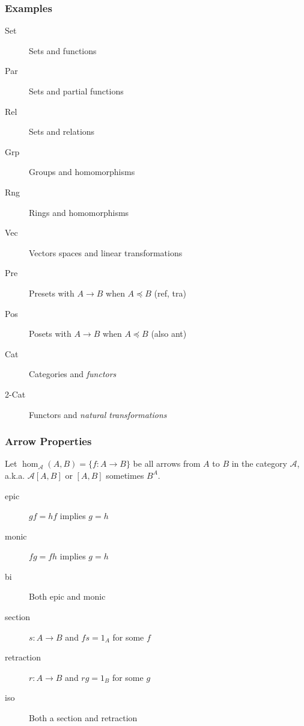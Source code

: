 \documentclass[12pt,fleqn]{beamer}
\begin{document}
\begin{frame}
\frametitle{Examples}
\begin{description}
\item[Set] Sets and functions
\item[Par] Sets and partial functions
\item[Rel] Sets and relations
\item[Grp] Groups and homomorphisms
\item[Rng] Rings and homomorphisms
\item[Vec] Vectors spaces and linear transformations
\item[Pre] Presets with \(A\to B\) when \(A\preceq B\) (ref, tra)
\item[Pos] Posets with \(A\to B\) when \(A\preceq B\) (also ant)
\item[Cat] Categories and {\em functors}
\item[2-Cat] Functors and {\em natural transformations}
\end{description}
\end{frame}

\begin{frame}
\frametitle{Arrow Properties}
Let \(\hom_\mathcal{A}(A,B) = \{f\colon A\to B\}\) be all arrows from \(A\) to \(B\)
in the category \(\mathcal{A}\),
a.k.a. \(\mathcal{A}[A,B]\) or \([A,B]\) sometimes \(B^A\).
\begin{description}
\item[epic] \(gf = hf\) implies \(g = h\)
\item[monic] \(fg = fh\) implies \(g = h\)
\item[bi] Both epic and monic
\item[section] \(s\colon A\to B\) and \(fs = 1_A\) for some \(f\)
\item[retraction] \(r\colon A\to B\) and \(rg = 1_B\) for some \(g\)
\item[iso] Both a section and retraction
\end{description}

\end{frame}
\end{document}
